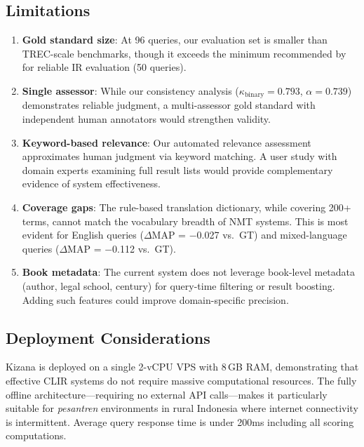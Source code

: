 \documentclass[preprint,12pt,authoryear]{elsarticle}
\begin{document}
\subsection{Limitations}

\begin{enumerate}
    \item \textbf{Gold standard size}: At 96 queries, our evaluation set is smaller than TREC-scale benchmarks, though it exceeds the minimum recommended by \citet{zobel1998reliable} for reliable IR evaluation (50 queries).

    \item \textbf{Single assessor}: While our consistency analysis ($\kappa_{\text{binary}} = 0.793$, $\alpha = 0.739$) demonstrates reliable judgment, a multi-assessor gold standard with independent human annotators would strengthen validity.

    \item \textbf{Keyword-based relevance}: Our automated relevance assessment approximates human judgment via keyword matching. A user study with domain experts examining full result lists would provide complementary evidence of system effectiveness.

    \item \textbf{Coverage gaps}: The rule-based translation dictionary, while covering 200+ terms, cannot match the vocabulary breadth of NMT systems. This is most evident for English queries ($\Delta$MAP = $-$0.027 vs.\ GT) and mixed-language queries ($\Delta$MAP = $-$0.112 vs.\ GT).

    \item \textbf{Book metadata}: The current system does not leverage book-level metadata (author, legal school, century) for query-time filtering or result boosting. Adding such features could improve domain-specific precision.
\end{enumerate}

\subsection{Deployment Considerations}

Kizana is deployed on a single 2-vCPU VPS with 8\,GB RAM, demonstrating that effective CLIR systems do not require massive computational resources. The fully offline architecture---requiring no external API calls---makes it particularly suitable for \textit{pesantren} environments in rural Indonesia where internet connectivity is intermittent. Average query response time is under 200ms including all scoring computations.
\end{document}
